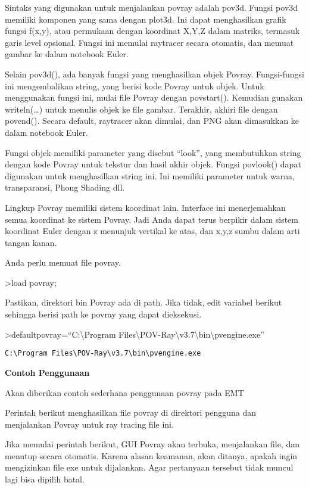 \documentclass[
]{book}
\begin{document}
Sintaks yang digunakan untuk menjalankan povray adalah pov3d. Fungsi pov3d memiliki komponen yang sama dengan plot3d. Ini dapat menghasilkan grafik fungsi f(x,y), atau permukaan dengan koordinat X,Y,Z dalam matriks, termasuk garis level opsional. Fungsi ini memulai raytracer secara otomatis, dan memuat gambar ke dalam notebook Euler.

Selain pov3d(), ada banyak fungsi yang menghasilkan objek Povray. Fungsi-fungsi ini mengembalikan string, yang berisi kode Povray untuk objek. Untuk menggunakan fungsi ini, mulai file Povray dengan povstart(). Kemudian gunakan writeln(\ldots) untuk menulis objek ke file gambar. Terakhir, akhiri file dengan povend(). Secara default, raytracer akan dimulai, dan PNG akan dimasukkan ke dalam notebook Euler.

Fungsi objek memiliki parameter yang disebut ``look'', yang membutuhkan string dengan kode Povray untuk tekstur dan hasil akhir objek. Fungsi povlook() dapat digunakan untuk menghasilkan string ini. Ini memiliki parameter untuk warna, transparansi, Phong Shading dll.

Lingkup Povray memiliki sistem koordinat lain. Interface ini menerjemahkan semua koordinat ke sistem Povray. Jadi Anda dapat terus berpikir dalam sistem koordinat Euler dengan z menunjuk vertikal ke atas, dan x,y,z sumbu dalam arti tangan kanan.

Anda perlu memuat file povray.

\textgreater load povray;

Pastikan, direktori bin Povray ada di path. Jika tidak, edit variabel berikut sehingga berisi path ke povray yang dapat dieksekusi.

\textgreater defaultpovray=``C:\textbackslash Program Files\textbackslash POV-Ray\textbackslash v3.7\textbackslash bin\textbackslash pvengine.exe''

\begin{verbatim}
C:\Program Files\POV-Ray\v3.7\bin\pvengine.exe
\end{verbatim}

\textbf{Contoh Penggunaan}

Akan diberikan contoh sederhana penggunaan povray pada EMT

Perintah berikut menghasilkan file povray di direktori pengguna dan menjalankan Povray untuk ray tracing file ini.

Jika memulai perintah berikut, GUI Povray akan terbuka, menjalankan file, dan menutup secara otomatis. Karena alasan keamanan, akan ditanya, apakah ingin mengizinkan file exe untuk dijalankan. Agar pertanyaan tersebut tidak muncul lagi bisa dipilih batal.
\end{document}
